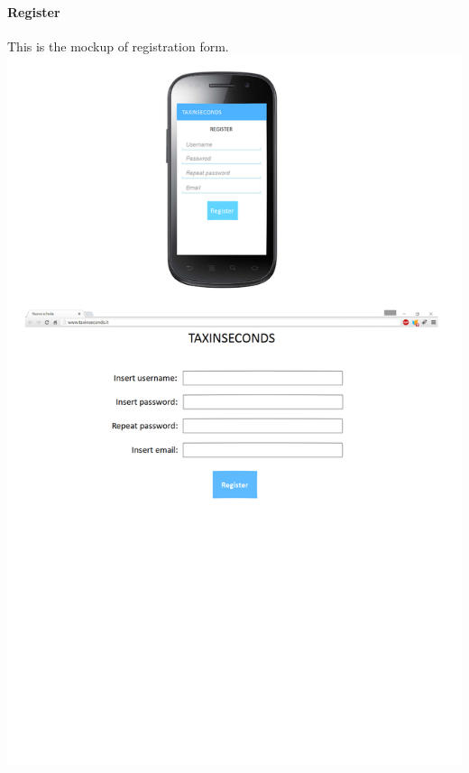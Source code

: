 \documentclass{article}
\begin{document}
\paragraph{Register}
This is the mockup of registration form.
\includegraphics{Register interface}
\clearpage
\end{document}

